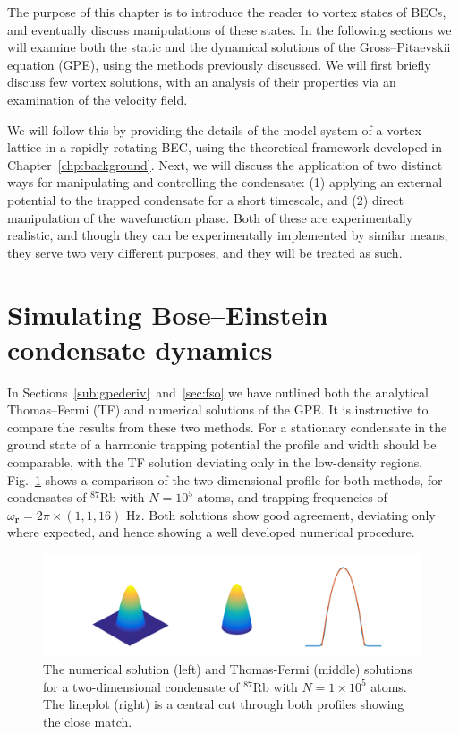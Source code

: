 The purpose of this chapter is to introduce the reader to vortex states of BECs, and eventually discuss manipulations of these states. In the following sections we will examine both the static and the dynamical solutions of the Gross--Pitaevskii equation (GPE), using the methods previously discussed. We will first briefly discuss few vortex solutions, with an analysis of their properties via an examination of the velocity field.

We will follow this by providing the details of the model system of a vortex lattice in a rapidly rotating BEC, using the theoretical framework developed in Chapter~\ref{chp:background}. Next, we will discuss the application of two distinct ways for manipulating and controlling the condensate: (1) applying an external potential to the trapped condensate for a short timescale, and (2) direct manipulation of the wavefunction phase. Both of these are experimentally realistic, and though they can be experimentally implemented by similar means, they serve two very different purposes, and they will be treated as such.

\section{Simulating Bose--Einstein condensate dynamics}

In Sections~\ref{sub:gpederiv}~and~\ref{sec:fso} we have outlined both the analytical Thomas--Fermi (TF) and numerical solutions of the GPE. It is instructive to compare the results from these two methods. For a stationary condensate in the ground state of a harmonic trapping potential the profile and width should be comparable, with the TF solution deviating only in the low-density regions. Fig.~\ref{fig:gpe_tf_3} shows a comparison of the two-dimensional profile for both methods, for condensates of $^{87}$Rb with $N=10^{5}$ atoms, and trapping frequencies of $\omega_{\mathbf{r}}=2\pi\times (1, 1, 16 )$ Hz. Both solutions show good agreement, deviating only where expected, and hence showing a well developed numerical procedure.
\begin{figure}\centering
    \includegraphics[width=\textwidth,trim=0ex 0ex 0ex 0ex]{Images/ch4_vtx/gpe_tf_3.pdf}
    \caption{The numerical solution (left) and Thomas-Fermi (middle) solutions for a two-dimensional condensate of $^{87}$Rb with $N=1\times 10^5$ atoms. The lineplot (right) is a central cut through both profiles showing the close match.}\label{fig:gpe_tf_3}
\end{figure}

